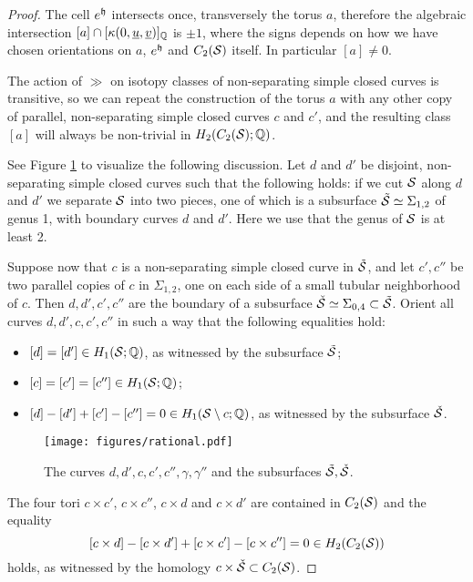 \begin{proof}
The cell $e^{\tup}$ intersects once, transversely the torus $a$, therefore the
algebraic intersection $[a]\cap[\kappa(0,\uu,\uv)]_{\Q}$ is $\pm 1$,
where the signs depends on how we have chosen orientations on $a$, $e^{\tup}$ and $C_2(\S)$ itself.
In particular $[a]\neq 0$.

The action of $\gg$ on isotopy classes of non-separating simple closed curves is transitive, so we can repeat
the construction of the torus $a$ with any other copy of parallel, non-separating simple closed curves
$c$ and $c'$, and the resulting class $[a]$ will always be non-trivial in $H_2(C_2(\S);\Q)$.

See Figure \ref{fig:rational} to visualize the following discussion.
Let $d$ and $d'$ be disjoint, non-separating simple closed curves such that
the following holds: if we cut $\S$ along $d$ and $d'$ we separate $\S$ into two pieces, one of
which is a subsurface $\tilde{\S}\simeq\Sigma_{1,2}$ of genus 1, with boundary
curves $d$ and $d'$. Here we use that the genus of $\S$ is at least 2.

Suppose now that $c$ is a non-separating simple closed curve in $\tilde{\S}$,
and let $c',c''$ be two parallel copies of $c$ in $\Sigma_{1,2}$, one on each side of a small tubular
neighborhood of $c$.
Then $d,d',c',c''$ are the boundary of a subsurface $\check{\S}\simeq\Sigma_{0,4}\subset\tilde{\S}$.
Orient all curves $d,d',c,c',c''$ in such a way that the following equalities hold:
\begin{itemize}
 \item $[d]=[d']\in H_1(\S;\Q)$, as witnessed by the subsurface $\tilde{\S}$;
 \item $[c]=[c']=[c'']\in H_1(\S;\Q)$;
 \item $[d]-[d']+[c']-[c'']=0\in H_1(\S\setminus c;\Q)$, as witnessed by the subsurface $\check{\S}$.
\end{itemize}

\begin{figure}\centering
 \texttt{[image: figures/rational.pdf]}
 \caption{The curves $d,d',c,c',c'',\gamma,\gamma''$ and the subsurfaces $\tilde{\S},\check{\S}$.}
\label{fig:rational}
\end{figure}

The four tori $c\times c'$, $c\times c''$, $c\times d$ and $c\times d'$ are contained in $C_2(\S)$
and the equality
\[
 [c\times d]-[c\times d']+[c\times c']-[c\times c'']=0\in H_2(C_2(\S))
\]
holds, as witnessed by the homology $c\times \check{\S}\subset C_2(\S)$.


\end{proof}
